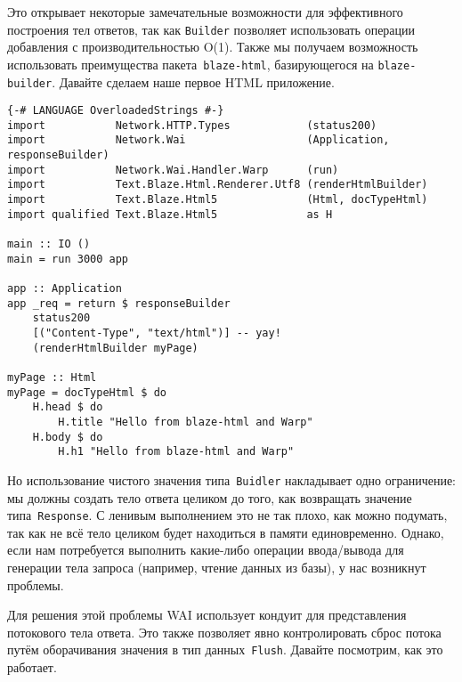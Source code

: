Это открывает некоторые замечательные возможности для эффективного построения
тел ответов, так как \lstinline'Builder' позволяет использовать операции
добавления с производительностью O(1). Также мы получаем возможность
использовать преимущества пакета~\texttt{blaze-html}, базирующегося на
\texttt{blaze-builder}. Давайте сделаем наше первое HTML приложение.
\begin{lstlisting}
{-# LANGUAGE OverloadedStrings #-}
import           Network.HTTP.Types            (status200)
import           Network.Wai                   (Application, responseBuilder)
import           Network.Wai.Handler.Warp      (run)
import           Text.Blaze.Html.Renderer.Utf8 (renderHtmlBuilder)
import           Text.Blaze.Html5              (Html, docTypeHtml)
import qualified Text.Blaze.Html5              as H

main :: IO ()
main = run 3000 app

app :: Application
app _req = return $ responseBuilder
    status200
    [("Content-Type", "text/html")] -- yay!
    (renderHtmlBuilder myPage)

myPage :: Html
myPage = docTypeHtml $ do
    H.head $ do
        H.title "Hello from blaze-html and Warp"
    H.body $ do
        H.h1 "Hello from blaze-html and Warp"
\end{lstlisting}

Но использование чистого значения типа~\lstinline'Buidler' накладывает одно
ограничение: мы должны создать тело ответа целиком до того, как возвращать
значение типа~\lstinline'Response'. С ленивым выполнением это не так плохо, как
можно подумать, так как не всё тело целиком будет находиться в памяти
единовременно. Однако, если нам потребуется выполнить какие-либо операции
ввода/вывода для генерации тела запроса (например, чтение данных из базы), у
нас возникнут проблемы.

Для решения этой проблемы WAI использует кондуит для представления потокового
тела ответа. Это также позволяет явно контролировать сброс потока путём
оборачивания значения в тип данных~\lstinline'Flush'. Давайте посмотрим, как
это работает.

